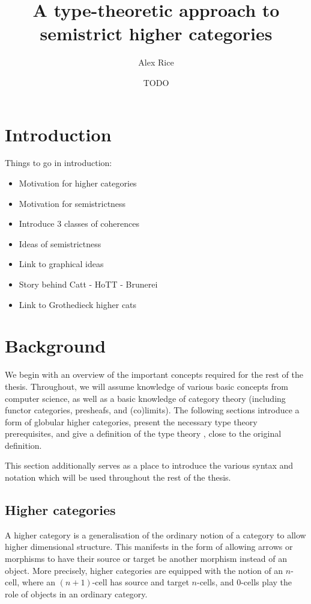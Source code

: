 \documentclass{cam-thesis}
\title{A type-theoretic approach to semistrict higher categories}
\author{Alex Rice}
\date{TODO}
\begin{document}
\frontmatter{}



\chapter{Introduction}
Things to go in introduction:
\begin{itemize}
\item Motivation for higher categories
\item Motivation for semistrictness
\item Introduce 3 classes of coherences
\item Ideas of semistrictness
\item Link to graphical ideas
\item Story behind Catt - HoTT - Brunerei
\item Link to Grothedieck higher cats
\end{itemize}

\chapter{Background}
\label{sec:background}

We begin with an overview of the important concepts required for the rest of the thesis. Throughout, we will assume knowledge of various basic concepts from computer science, as well as a basic knowledge of category theory (including functor categories, presheafs, and (co)limits). The following sections introduce a form of globular higher categories, present the necessary type theory prerequisites, and give a definition of the type theory \Catt, close to the original definition.

This section additionally serves as a place to introduce the various syntax and notation which will be used throughout the rest of the thesis.

\section{Higher categories}
\label{sec:higher-categories}

A higher category is a generalisation of the ordinary notion of a category to allow higher dimensional structure. This manifests in the form of allowing arrows or morphisms to have their source or target be another morphism instead of an object. More precisely, higher categories are equipped with the notion of an \(n\)-cell, where an \((n+1)\)-cell has source and target \(n\)-cells, and \(0\)-cells play the role of objects in an ordinary category.
\end{document}
